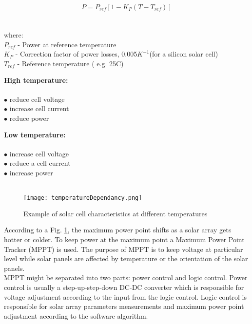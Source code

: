 \begin{equation}
P = P_{ref} [ 1 - K_{P} ( T - T_{ref}) ]
\end{equation}
	\\
	\\
where:\\
     $P_{ref}$ - Power at reference temperature\\
     $K_{P}$ - Correction factor of power losses, 0.005$K^{-1}$(for a silicon solar cell)\\
     $T_{ref}$ - Reference temperature ( e.g. 25\textdegree{}C)\\
     
     

\begin{multicols}{2}
	\textbf{High  temperature:} \\ \\
	$\bullet$ reduce cell voltage \\
	$\bullet$ increase cell current\\
	$\bullet$ reduce power\\
	

	\columnbreak
	
	\textbf{Low temperature:}\\ \\
	$\bullet$ increase cell voltage\\
	$\bullet$ reduce a cell current\\
	$\bullet$ increase power\\
	\\
\end{multicols}


	\begin{figure}[h]
		\centering
		\texttt{[image: temperatureDependancy.png]}
		\caption{ Example of solar cell characteristics at different temperatures\cite{6} }
		\label{fig: EPS11}
	\end{figure}
	
According to a Fig. \ref{fig: EPS11}, the maximum power point shifts as a solar array gets hotter or colder. To keep power at the maximum point a Maximum Power Point Tracker (MPPT) is used. The purpose of MPPT is to keep voltage at particular level while solar panels are affected by temperature or the orientation of the solar panels.\\
\cite{20} MPPT might be separated into two parts: power control and logic control. Power control is usually a step-up-step-down DC-DC  converter which is responsible for voltage adjustment according to the input from the logic control. Logic control is responsible for solar array parameters measurements and maximum power point adjustment according to the software algorithm.\\  

